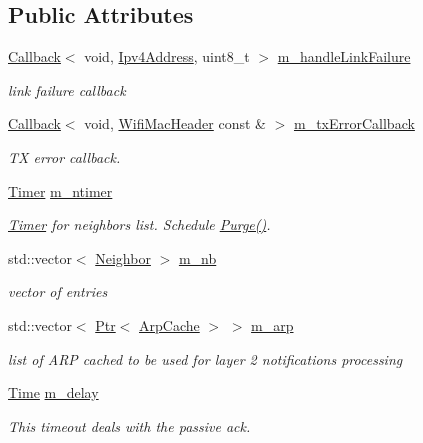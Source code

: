 \subsection*{Public Attributes}
\begin{DoxyCompactItemize}
\item 
\hyperlink{classns3_1_1Callback}{Callback}$<$ void, \hyperlink{classns3_1_1Ipv4Address}{Ipv4\+Address}, uint8\+\_\+t $>$ \hyperlink{classns3_1_1dsr_1_1DsrRouteCache_ac784b52b7d230343a1c7c236dfe91aa6}{m\+\_\+handle\+Link\+Failure}
\begin{DoxyCompactList}\small\item\em link failure callback \end{DoxyCompactList}\item 
\hyperlink{classns3_1_1Callback}{Callback}$<$ void, \hyperlink{classns3_1_1WifiMacHeader}{Wifi\+Mac\+Header} const \& $>$ \hyperlink{classns3_1_1dsr_1_1DsrRouteCache_a797049d1a514f43ed1fc286a0fd7649f}{m\+\_\+tx\+Error\+Callback}
\begin{DoxyCompactList}\small\item\em TX error callback. \end{DoxyCompactList}\item 
\hyperlink{classns3_1_1Timer}{Timer} \hyperlink{classns3_1_1dsr_1_1DsrRouteCache_adc0e73e78b967981ebb4fc79723517c2}{m\+\_\+ntimer}
\begin{DoxyCompactList}\small\item\em \hyperlink{classns3_1_1Timer}{Timer} for neighbor\textquotesingle{}s list. Schedule \hyperlink{classns3_1_1dsr_1_1DsrRouteCache_a33ac58361cc0e1cbe1b561db26f5dc82}{Purge()}. \end{DoxyCompactList}\item 
std\+::vector$<$ \hyperlink{structns3_1_1dsr_1_1DsrRouteCache_1_1Neighbor}{Neighbor} $>$ \hyperlink{classns3_1_1dsr_1_1DsrRouteCache_aaab1b839f2609fdb6545124dcde67ea1}{m\+\_\+nb}
\begin{DoxyCompactList}\small\item\em vector of entries \end{DoxyCompactList}\item 
std\+::vector$<$ \hyperlink{classns3_1_1Ptr}{Ptr}$<$ \hyperlink{classns3_1_1ArpCache}{Arp\+Cache} $>$ $>$ \hyperlink{classns3_1_1dsr_1_1DsrRouteCache_a7e39c179e1fb9968ff73c11eac4a4605}{m\+\_\+arp}
\begin{DoxyCompactList}\small\item\em list of A\+RP cached to be used for layer 2 notifications processing \end{DoxyCompactList}\item 
\hyperlink{classns3_1_1Time}{Time} \hyperlink{classns3_1_1dsr_1_1DsrRouteCache_aa3ab752671f0fabc953a166e265eab7c}{m\+\_\+delay}
\begin{DoxyCompactList}\small\item\em This timeout deals with the passive ack. \end{DoxyCompactList}\end{DoxyCompactItemize}
